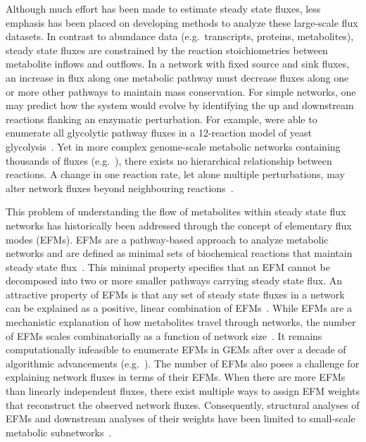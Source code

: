 \documentclass[12pt]{article}
\begin{document}
Although much effort has been made to estimate steady state fluxes, less
emphasis has been placed on developing methods to analyze these
large-scale flux datasets. In contrast to abundance data (e.g.\
transcripts, proteins, metabolites), steady state fluxes are constrained
by the reaction stoichiometries between metabolite inflows and outflows.
In a network with fixed source and sink fluxes, an increase in flux along
one metabolic pathway must decrease fluxes along one or more other
pathways to maintain mass conservation. For simple networks, one may
predict how the system would evolve by identifying the up and downstream
reactions flanking an enzymatic perturbation. For example,
\citeauthor{SchwartzJean-Marc2006Qema} were able to
enumerate all glycolytic pathway fluxes in a 12-reaction model of yeast
glycolysis~\citep{SchwartzJean-Marc2006Qema}. Yet in more complex genome-scale
metabolic networks containing thousands of fluxes
(e.g.\ \cite{BrunkElizabeth2018Reat,RobinsonJonathanL2020Aaoh,WangHao2021Gmnr}),
there exists no hierarchical relationship between reactions. A change in one
reaction rate, let alone multiple perturbations, may alter network fluxes
beyond neighbouring reactions~\citep{NobileMarcoS2021Agsa}.

This problem of understanding the flow of metabolites within steady state
flux networks has historically been addressed through the concept of
elementary flux modes (EFMs). EFMs are a pathway-based approach to analyze
metabolic networks and are defined as minimal sets of biochemical
reactions that maintain steady state flux~\citep{SchusterStefan1994Oefm}.
This minimal property specifies that an EFM cannot be decomposed into two
or more smaller pathways carrying steady state flux. An attractive
property of EFMs is that any set of steady state fluxes in a network can
be explained as a positive, linear combination of
EFMs~\citep{SchusterStefan1999Doef}. While EFMs are a mechanistic
explanation of how metabolites travel through networks, the number of EFMs
scales combinatorially as a function of network
size~\citep{AcunaVicente2009Maci}. It remains computationally infeasible
to enumerate EFMs in GEMs after over a decade of algorithmic advancements
(e.g.\
\citealt{GagneurJulien2004Coem,TerzerMarco2008Lcoe,BuchnerBiancaA2021EaPp}).
The number of EFMs also poses a challenge for explaining network fluxes in
terms of their EFMs. When there are more EFMs than linearly independent
fluxes, there exist multiple ways to assign EFM weights that reconstruct
the observed network fluxes. Consequently, structural analyses of EFMs and
downstream analyses of their weights have been limited to small-scale
metabolic
subnetworks~\citep{FakihIbrahim2023Dgmm,MpabanziLiliane2022Frca,ToyaYoshihiro2022Mpef,MatsudaFumio2011Esoy,SchwartzJean-Marc2006Qema}.
\end{document}
